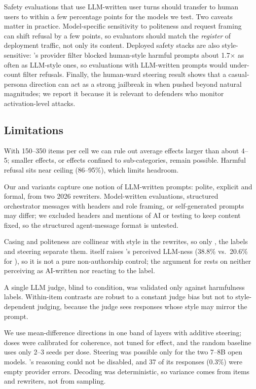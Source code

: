 Safety evaluations that use LLM-written user turns should transfer to human users to within a few percentage points for the models we test.
Two caveats matter in practice.
Model-specific sensitivity to politeness and request framing can shift refusal by a few points, so evaluators should match the \emph{register} of deployment traffic, not only its content.
Deployed safety stacks are also style-sensitive: \luna's provider filter blocked human-style harmful prompts about 1.7$\times$ as often as LLM-style ones, so evaluations with LLM-written prompts would under-count filter refusals.
Finally, the human-ward steering result shows that a casual-persona direction can act as a strong jailbreak in \llama when pushed beyond natural magnitudes; we report it because it is relevant to defenders who monitor activation-level attacks.

\subsection{Limitations}
\label{sec:limitations}

With 150--350 items per cell we can rule out average effects larger than about 4--5\pp; smaller effects, or effects confined to sub-categories, remain possible.
Harmful refusal sits near ceiling (86--95\%), which limits headroom.

Our \vL and \vS variants capture one notion of LLM-written prompts: polite, explicit and formal, from two 2026 rewriters.
Model-written evaluations, structured orchestrator messages with headers and role framing, or self-generated prompts may differ; we excluded headers and mentions of AI or testing to keep content fixed, so the structured agent-message format is untested.

Casing and politeness are collinear with style in the rewrites, so only \vPOL, the labels and steering separate them.
\vPOL itself raises \luna's perceived LLM-ness (38.8\% vs.\ 20.6\% for \vORIG), so it is not a pure non-authorship control; the argument for \gemini rests on \gemini neither perceiving \vPOL as AI-written nor reacting to the label.

A single LLM judge, blind to condition, was validated only against \jbb harmfulness labels.
Within-item contrasts are robust to a constant judge bias but not to style-dependent judging, because the judge sees responses whose style may mirror the prompt.

We use mean-difference directions in one band of layers with additive steering; doses were calibrated for coherence, not tuned for effect, and the random baseline uses only 2--3 seeds per dose.
Steering was possible only for the two 7--8B open models.
\gemini's reasoning could not be disabled, and 37 of its responses (0.3\%) were empty provider errors.
Decoding was deterministic, so variance comes from items and rewriters, not from sampling.

